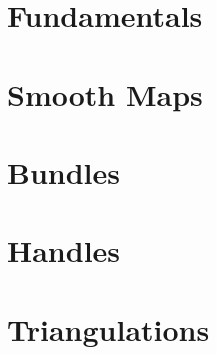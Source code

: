 

\section{Fundamentals}


\section{Smooth Maps}


\section{Bundles}


\section{Handles}



\section{Triangulations}



%
